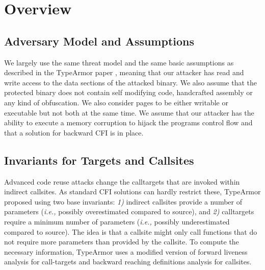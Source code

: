 \section{Overview}
\label{chapter:TypeShild Overview}

\subsection{Adversary Model and Assumptions}
\label{Adversary Model}

We largely use the same threat model and the same basic assumptions as described in the TypeArmor 
paper \cite{veen:typearmor}, meaning that our attacker has read and write access to the data 
sections of the attacked binary.  We also assume that the protected binary does not contain 
self modifying code, handcrafted assembly or any kind of obfuscation. We also consider pages 
to be either writable or executable but not both at the same time. We assume 
that our attacker has the ability to execute a memory corruption to hijack the programs 
control flow and that a solution for backward CFI is in place.

\subsection{Invariants for Targets and Callsites}
\label{Invariants for Targets and Callsites}
Advanced code reuse attacks change the calltargets that are invoked within indirect 
callsites. As standard CFI solutions can hardly restrict these, TypeArmor proposed using two base invariants:
\textit{1)} indirect callsites provide a number of parameters (\textit{i.e.,} possibly overestimated compared to source), and 
\textit{2)} calltargets require a minimum number of parameters (\textit{i.e.,} possibly underestimated compared to source).
The idea is that a callsite might only call functions that do not require more parameters than provided by the callsite. 
To compute the necessary information, TypeArmor uses a modified version of forward liveness analysis for call-targets and 
backward reaching definitions analysis for callsites.

